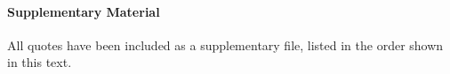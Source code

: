 \documentclass{CUP-JNL-DAP}%
\begin{document}
\begin{Backmatter}
\paragraph{Supplementary Material}
All quotes have been included as a supplementary file, listed in the order shown in this text.





%   
%   
%   

\end{Backmatter}
\end{document}
